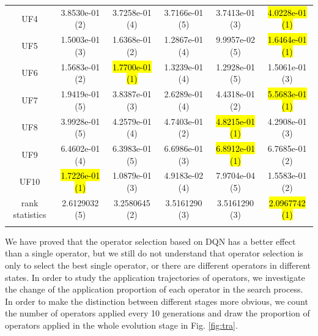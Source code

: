 \documentclass[journal]{IEEEtran}
\begin{document}
\begin{table}[tbp]
\begin{tabular}{cccccc}
    UF4             & 3.8530e-01 (2)      & 3.7258e-01 (4)      & 3.7166e-01 (5)    & 3.7413e-01 (3)      & \hl{4.0228e-01 (1)} \\
    UF5             & 1.5003e-01 (3)      & 1.6368e-01 (2)      & 1.2867e-01 (4)    & 9.9957e-02 (5)      & \hl{1.6464e-01 (1)} \\
    UF6             & 1.5683e-01 (2)      & \hl{1.7700e-01 (1)} & 1.3239e-01 (4)    & 1.2928e-01 (5)      & 1.5061e-01 (3)      \\
    UF7             & 1.9419e-01 (5)      & 3.8387e-01 (3)      & 2.6289e-01 (4)    & 4.4318e-01 (2)      & \hl{5.5683e-01 (1)} \\
    UF8             & 3.9928e-01 (5)      & 4.2579e-01 (4)      & 4.7403e-01 (2)    & \hl{4.8215e-01 (1)} & 4.2908e-01 (3)      \\
    UF9             & 6.4602e-01 (4)      & 6.3983e-01 (5)      & 6.6986e-01 (3)    & \hl{6.8912e-01 (1)} & 6.7685e-01 (2)      \\
    UF10            & \hl{1.7226e-01 (1)} & 1.0879e-01 (3)      & 4.9183e-02 (4)    & 7.9704e-04 (5)      & 1.5583e-01 (2)      \\
    \hline
    rank statistics & 2.6129032 (5)       & 3.2580645 (2)       & 3.5161290 (3)     & 3.5161290 (3)       & \hl{2.0967742 (1)}  \\
    \bottomrule
    \label{tab:hv_ops}
  \end{tabular}
\end{table}

We have proved that the operator selection based on DQN has a better effect than a single operator, but we still do not understand that operator selection is only to select the best single operator, or there are different operators in different states. In order to study the application trajectories of operators, we investigate the change of the application proportion of each operator in the search process.
In order to make the distinction between different stages more obvious, we count the number of operators applied every 10 generations and draw the proportion of operators applied in the whole evolution stage in Fig. \ref{fig:tra}.
\end{document}
